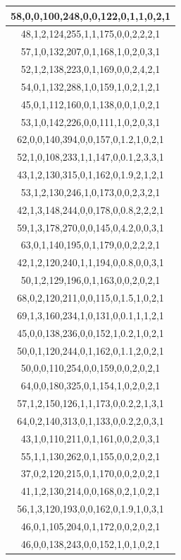 \documentclass{article}
\begin{document}
\begin{table}[h!]
\begin{tabular}{|c|}
58,0,0,100,248,0,0,122,0,1,1,0,2,1 \\ \hline
48,1,2,124,255,1,1,175,0,0,2,2,2,1 \\ \hline
57,1,0,132,207,0,1,168,1,0,2,0,3,1 \\ \hline
52,1,2,138,223,0,1,169,0,0,2,4,2,1 \\ \hline
54,0,1,132,288,1,0,159,1,0,2,1,2,1 \\ \hline
45,0,1,112,160,0,1,138,0,0,1,0,2,1 \\ \hline
53,1,0,142,226,0,0,111,1,0,2,0,3,1 \\ \hline
62,0,0,140,394,0,0,157,0,1.2,1,0,2,1 \\ \hline
52,1,0,108,233,1,1,147,0,0.1,2,3,3,1 \\ \hline
43,1,2,130,315,0,1,162,0,1.9,2,1,2,1 \\ \hline
53,1,2,130,246,1,0,173,0,0,2,3,2,1 \\ \hline
42,1,3,148,244,0,0,178,0,0.8,2,2,2,1 \\ \hline
59,1,3,178,270,0,0,145,0,4.2,0,0,3,1 \\ \hline
63,0,1,140,195,0,1,179,0,0,2,2,2,1 \\ \hline
42,1,2,120,240,1,1,194,0,0.8,0,0,3,1 \\ \hline
50,1,2,129,196,0,1,163,0,0,2,0,2,1 \\ \hline
68,0,2,120,211,0,0,115,0,1.5,1,0,2,1 \\ \hline
69,1,3,160,234,1,0,131,0,0.1,1,1,2,1 \\ \hline
45,0,0,138,236,0,0,152,1,0.2,1,0,2,1 \\ \hline
50,0,1,120,244,0,1,162,0,1.1,2,0,2,1 \\ \hline
50,0,0,110,254,0,0,159,0,0,2,0,2,1 \\ \hline
64,0,0,180,325,0,1,154,1,0,2,0,2,1 \\ \hline
57,1,2,150,126,1,1,173,0,0.2,2,1,3,1 \\ \hline
64,0,2,140,313,0,1,133,0,0.2,2,0,3,1 \\ \hline
43,1,0,110,211,0,1,161,0,0,2,0,3,1 \\ \hline
55,1,1,130,262,0,1,155,0,0,2,0,2,1 \\ \hline
37,0,2,120,215,0,1,170,0,0,2,0,2,1 \\ \hline
41,1,2,130,214,0,0,168,0,2,1,0,2,1 \\ \hline
56,1,3,120,193,0,0,162,0,1.9,1,0,3,1 \\ \hline
46,0,1,105,204,0,1,172,0,0,2,0,2,1 \\ \hline
46,0,0,138,243,0,0,152,1,0,1,0,2,1 \\ \hline

\end{tabular}
\end{table}
\end{document}
